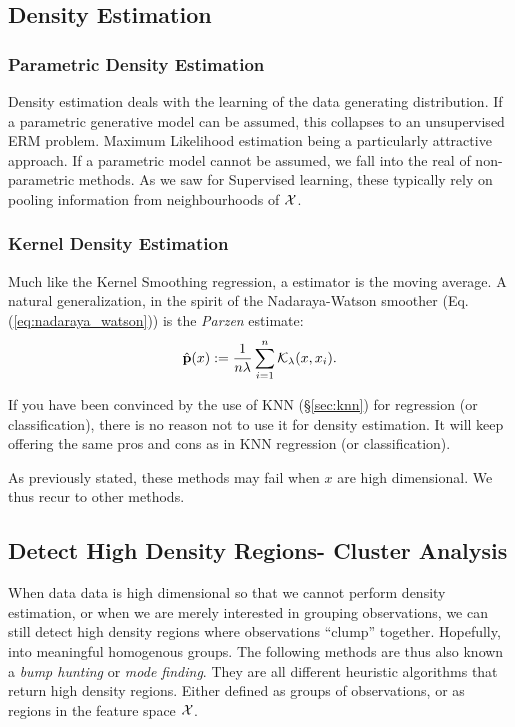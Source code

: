 \subsection{Density Estimation}
\label{sec:density_estimation}

\subsubsection{Parametric Density Estimation}
Density estimation deals with the learning of the data generating distribution.
If a parametric generative model can be assumed, this collapses to an unsupervised ERM problem. 
Maximum Likelihood estimation being a particularly attractive approach.
If a parametric model cannot be assumed, we fall into the real of non-parametric methods. As we saw for Supervised learning, these typically rely on pooling information from neighbourhoods of $\mathcal{X}$.

\subsubsection{Kernel Density Estimation}

Much like the Kernel Smoothing regression, a \naive estimator is the moving average.
A natural generalization, in the spirit of the Nadaraya-Watson smoother (Eq.(\ref{eq:nadaraya_watson})) is the \emph{Parzen} estimate:
\begin{align}
\label{eq:parzen}
	\hat{\mathbf{p}}(x):=\frac{1}{n \lambda} \sum_{i=1}^n \mathcal{K}_\lambda(x,x_i).
\end{align}

\begin{remark}
If you have been convinced by the use of KNN (\S\ref{sec:knn}) for regression (or classification), there is no reason not to use it for density estimation. It will keep offering the same pros and cons as in KNN regression (or classification).
\end{remark}

As previously stated, these methods may fail when $x$ are high dimensional. We thus recur to other methods.


\subsection{Detect High Density Regions- Cluster Analysis}
When data data is high dimensional so that we cannot perform density estimation, or when we are merely interested in grouping observations, we can still detect high density regions where observations ``clump'' together. Hopefully, into meaningful homogenous groups.
The following methods are thus also known a \emph{bump hunting} or \emph{mode finding}.
They are all different heuristic algorithms that return high density regions. Either defined as groups of observations, or as regions in the feature space $\mathcal{X}$.

